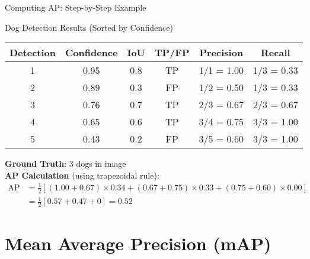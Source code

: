 \documentclass[usenames,dvipsnames]{beamer}
\begin{document}
	\begin{frame}{Computing AP: Step-by-Step Example}
		\begin{center}
		\begin{examplebox}{Dog Detection Results (Sorted by Confidence)}
		\begin{tabular}{|c|c|c|c|c|c|}
		\hline
		\textbf{Detection} & \textbf{Confidence} & \textbf{IoU} & \textbf{TP/FP} & \textbf{Precision} & \textbf{Recall} \\
		\hline
		1 & 0.95 & 0.8 & TP & 1/1 = 1.00 & 1/3 = 0.33 \\
		2 & 0.89 & 0.3 & FP & 1/2 = 0.50 & 1/3 = 0.33 \\
		3 & 0.76 & 0.7 & TP & 2/3 = 0.67 & 2/3 = 0.67 \\
		4 & 0.65 & 0.6 & TP & 3/4 = 0.75 & 3/3 = 1.00 \\
		5 & 0.43 & 0.2 & FP & 3/5 = 0.60 & 3/3 = 1.00 \\
		\hline
		\end{tabular}
		\end{examplebox}
		\end{center}
		
		\begin{keypointsbox}
		\textbf{Ground Truth}: 3 dogs in image \\
		\textbf{AP Calculation} (using trapezoidal rule):
		\begin{align}
		\text{AP} &= \frac{1}{2}[(1.00 + 0.67) \times 0.34 + (0.67 + 0.75) \times 0.33 + (0.75 + 0.60) \times 0.00] \\
		&= \frac{1}{2}[0.57 + 0.47 + 0] = 0.52
		\end{align}
		\end{keypointsbox}
	\end{frame}
	
	\section{Mean Average Precision (mAP)}
	
\end{document}
